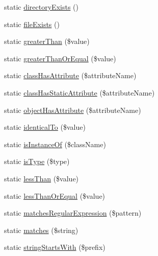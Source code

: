 \begin{DoxyCompactItemize}
\item 
static \mbox{\hyperlink{class_p_h_p_unit___framework___assert_aeff6357919ac620ffb892dc627f6b90b}{directory\+Exists}} ()
\item 
static \mbox{\hyperlink{class_p_h_p_unit___framework___assert_af38b35545d38d249c689615a4bc46ec1}{file\+Exists}} ()
\item 
static \mbox{\hyperlink{class_p_h_p_unit___framework___assert_ae91c32692b9b6c6eda066eda14e21bee}{greater\+Than}} (\$value)
\item 
static \mbox{\hyperlink{class_p_h_p_unit___framework___assert_ac3cdf050e416b37b461332a1102e68cd}{greater\+Than\+Or\+Equal}} (\$value)
\item 
static \mbox{\hyperlink{class_p_h_p_unit___framework___assert_a3b08089350dbb6db9218ff669400f9a3}{class\+Has\+Attribute}} (\$attribute\+Name)
\item 
static \mbox{\hyperlink{class_p_h_p_unit___framework___assert_a93e3a0af829c817ea47987ca29851358}{class\+Has\+Static\+Attribute}} (\$attribute\+Name)
\item 
static \mbox{\hyperlink{class_p_h_p_unit___framework___assert_a628f4db99294a237d96c432937bd1dfe}{object\+Has\+Attribute}} (\$attribute\+Name)
\item 
static \mbox{\hyperlink{class_p_h_p_unit___framework___assert_afa94881322dc417140524efbb8e7590e}{identical\+To}} (\$value)
\item 
static \mbox{\hyperlink{class_p_h_p_unit___framework___assert_ac4d2cbeb120f4caea971bcd83b136a59}{is\+Instance\+Of}} (\$class\+Name)
\item 
static \mbox{\hyperlink{class_p_h_p_unit___framework___assert_a5ce9b7cd8339182d239a947cabcc9059}{is\+Type}} (\$type)
\item 
static \mbox{\hyperlink{class_p_h_p_unit___framework___assert_af2371ae4b76e8bae3ad0b738b0a7a516}{less\+Than}} (\$value)
\item 
static \mbox{\hyperlink{class_p_h_p_unit___framework___assert_aec42c139b4e6ed79ab6b3ce3cd4d8290}{less\+Than\+Or\+Equal}} (\$value)
\item 
static \mbox{\hyperlink{class_p_h_p_unit___framework___assert_a9dfc313cd4f7d2a4fcc55bd5a67b067b}{matches\+Regular\+Expression}} (\$pattern)
\item 
static \mbox{\hyperlink{class_p_h_p_unit___framework___assert_aff4f7b5458838a6f0fb28a2b9aca31c2}{matches}} (\$string)
\item 
static \mbox{\hyperlink{class_p_h_p_unit___framework___assert_a3dd7a179f44c7ef8a8e2ece6daea222f}{string\+Starts\+With}} (\$prefix)

\end{DoxyCompactItemize}
